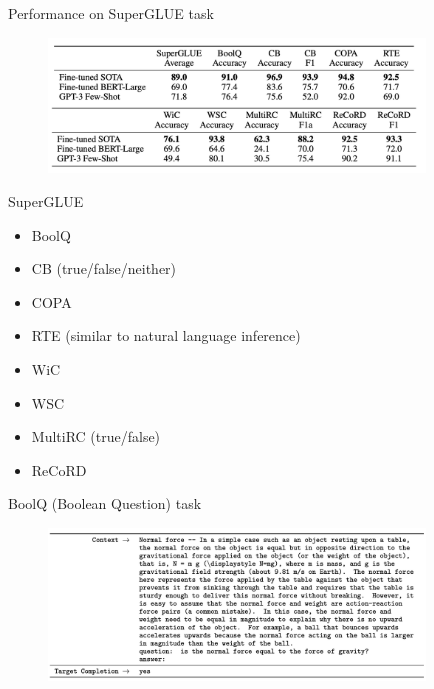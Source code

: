 \begin{vbframe}{Performance on SuperGLUE task}

\vfill

	\begin{figure}
		\centering
		\includegraphics[width=10cm]{figure/superglueperf.png}
	\end{figure}

\vfill

\end{vbframe}




\begin{vbframe}{SuperGLUE}

\vfill

  \begin{itemize}
\item BoolQ
\item CB (true/false/neither)
\item COPA
\item RTE (similar to natural language inference)
\item WiC 
\item WSC
\item MultiRC (true/false)
\item ReCoRD 
    \end{itemize}

\vfill

\end{vbframe}




\begin{vbframe}{BoolQ (Boolean Question) task}

\vfill

	\begin{figure}
		\centering
		\includegraphics[width=10cm]{figure/boolqtask.png}
	\end{figure}

\vfill

\end{vbframe}



